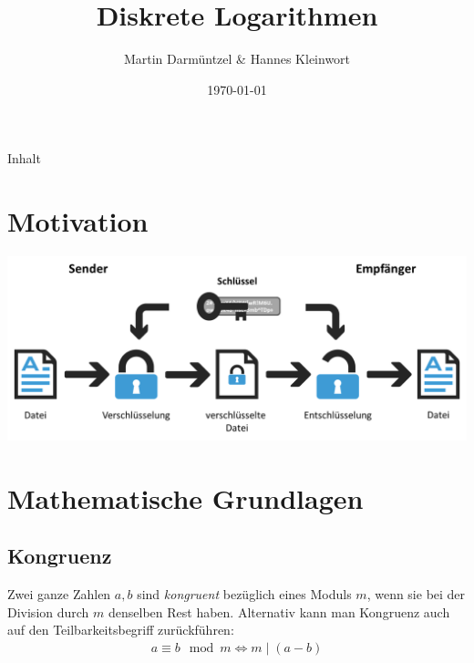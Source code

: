 \documentclass[utf8]{beamer}
\begin{document}
\title[]{Diskrete Logarithmen}
\author{Martin Darmüntzel \& Hannes Kleinwort}
\date{\today}

\begin{frame}
  \titlepage{}
\end{frame}

\begin{frame}[t]{Inhalt}
  \tableofcontents
\end{frame}

\section{Motivation}
\label{sec:motivation}

\begin{frame}{\insertsectionhead}
  \begin{center}
    \includegraphics[width=\textwidth]{verschluesselung.png}
  \end{center}
\end{frame}

\section{Mathematische Grundlagen}
\label{sec:mathematische_grundlagen}

\begin{frame}{\insertsectionhead}
  \tableofcontents[currentsection]
\end{frame}

\subsection{Kongruenz}
\label{sub:kongruenz}

\begin{frame}{\insertsubsectionhead}
  Zwei ganze Zahlen $a, b$ sind \emph{kongruent} bezüglich eines Moduls $m$,
  wenn sie bei der Division durch $m$ denselben Rest haben. Alternativ kann man
  Kongruenz auch auf den Teilbarkeitsbegriff zurückführen:
  \begin{align*}
    a \equiv b \mod m \Leftrightarrow m \mid (a - b)
  \end{align*}
\end{frame}
\end{document}
